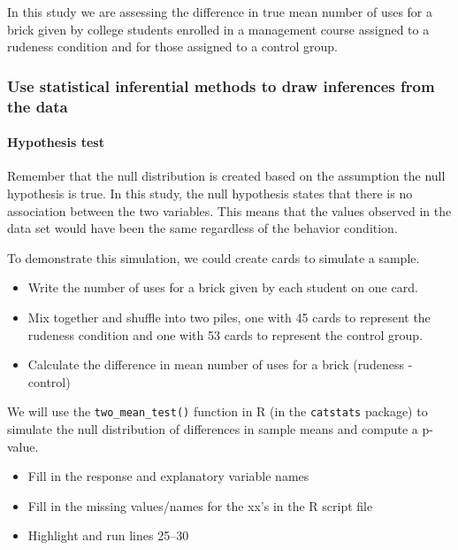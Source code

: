 \documentclass[
]{report}
\begin{document}
In this study we are assessing the difference in true mean number of uses for a brick given by college students enrolled in a management course assigned to a rudeness condition and for those assigned to a control group.

\subsubsection*{Use statistical inferential methods to draw inferences from the data}\label{use-statistical-inferential-methods-to-draw-inferences-from-the-data}

\paragraph*{Hypothesis test}\label{hypothesis-test}

Remember that the null distribution is created based on the assumption the null hypothesis is true. In this study, the null hypothesis states that there is no association between the two variables. This means that the values observed in the data set would have been the same regardless of the behavior condition.

To demonstrate this simulation, we could create cards to simulate a sample.

\begin{itemize}
\item
  Write the number of uses for a brick given by each student on one card.
\item
  Mix together and shuffle into two piles, one with 45 cards to represent the rudeness condition and one with 53 cards to represent the control group.
\item
  Calculate the difference in mean number of uses for a brick (rudeness - control)
\end{itemize}

We will use the \texttt{two\_mean\_test()} function in R (in the \texttt{catstats} package) to simulate the null distribution of differences in sample means and compute a p-value.

\begin{itemize}
\item
  Fill in the response and explanatory variable names
\item
  Fill in the missing values/names for the xx's in the R script file
\item
  Highlight and run lines 25--30
\end{itemize}
\end{document}
